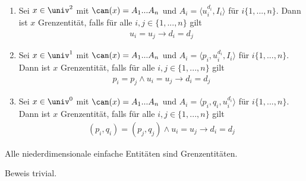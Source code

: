 \begin{dfn}[Grenzentität]\
    \begin{enumerate}
        \item Sei $x \in \univ^2$ mit $\can(x) = A_1 ... A_n$ und $A_i = \langle u_i^{d_i},I_i \rangle$ für $i \{1, ..., n\}$. Dann ist $x$ Grenzentität, falls für alle $i,j \in \{1, ..., n\}$ gilt
            \begin{align*}
                u_i = u_j \to d_i = d_j
            \end{align*}
        \item Sei $x \in \univ^1$ mit $\can(x) = A_1 ... A_n$ und $A_i = \langle p_i,u_i^{d_i},I_i \rangle$ für $i \{1, ..., n\}$. Dann ist $x$ Grenzentität, falls für alle $i,j \in \{1, ..., n\}$ gilt
            \begin{align*}
                p_i = p_j \land u_i = u_j \to d_i = d_j
            \end{align*}
        \item Sei $x \in \univ^0$ mit $\can(x) = A_1 ... A_n$ und $A_i = \langle p_i,q_i,u_i^{d_i} \rangle$ für $i \{1, ..., n\}$. Dann ist $x$ Grenzentität, falls für alle $i,j \in \{1, ..., n\}$ gilt
            \begin{align*}
                (p_i, q_i) = (p_j,q_j) \land u_i = u_j \to d_i = d_j
            \end{align*}
    \end{enumerate}
\end{dfn}

\begin{satz}\label{satz:einfachgrenze}
    Alle niederdimensionale einfache Entitäten sind Grenzentitäten.
\end{satz}
Beweis trivial.



